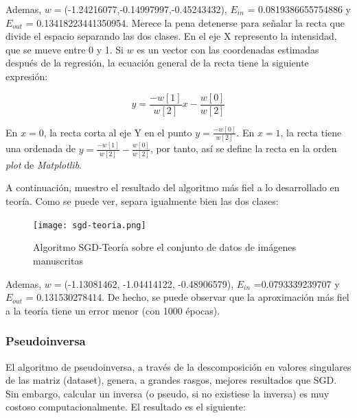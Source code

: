 Ademas, $w=$(-1.24216077,-0.14997997,-0.45243432), $E_{in}$ = 0.0819386655754886 y $E_{out}$ = 0.13418223441350954.
Merece la pena detenerse para señalar la recta que divide el espacio separando las dos clases. En el eje X represento la intensidad, que se mueve entre 0 y 1. Si $w$ es un vector con las coordenadas estimadas después de la regresión, la ecuación general de la recta tiene la siguiente expresión:

$$y = \frac{-w[1]}{w[2]}x - \frac{w[0]}{w[2]}$$

En $x=0$, la recta corta al eje Y en el punto $y = \frac{-w[0]}{w[2]}$. En $x=1$, la recta tiene una ordenada de $y=\frac{-w[1]}{w[2]}- \frac{w[0]}{w[2]}$, por tanto, así se define la recta en la orden \textit{plot} de \textit{Matplotlib}.

A continuación, muestro el resultado del algoritmo más fiel a lo desarrollado en teoría. Como se puede ver, separa igualmente bien las dos clases:

\begin{figure}[H] %
	\centering
	\texttt{[image: sgd-teoria.png]}  %
	\caption{Algoritmo SGD-Teoría sobre el conjunto de datos de imágenes manuscritas} 
	\label{fig:sgd_teoria}
\end{figure}

Ademas, $w=$(-1.13081462, -1.04414122, -0.48906579), $E_{in}$ =0.0793339239707  y $E_{out}$ = 0.131530278414. De hecho, se puede observar que la aproximación más fiel a la teoría tiene un error menor (con 1000 épocas).

\newpage

\subsubsection{Pseudoinversa}

El algoritmo de pseudoinversa, a través de la descomposición en valores singulares de las matriz (dataset), genera, a grandes rasgos, mejores resultados que SGD. Sin embargo, calcular un inversa (o pseudo, si no existiese la inversa) es muy costoso computacionalmente. El resultado es el siguiente:

